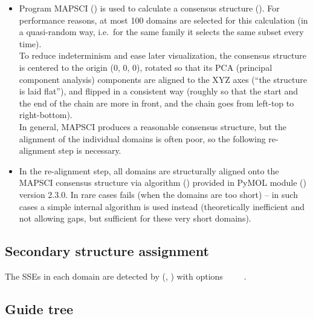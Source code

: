 \documentclass{article}
\begin{document}
\begin{itemize}
\item
  Program MAPSCI () is used to calculate a
  consensus structure ().
  For performance reasons, at most 100 domains are selected for this
  calculation (in a quasi-random way, i.e.~for the same family it selects 
  the same subset every time).\\
  To reduce indeterminism and ease later visualization, the consensus
  structure is centered to the origin (0, 0, 0), rotated so that its PCA
  (principal component analysis)
  components are aligned to the XYZ axes (``the structure is laid
  flat''), and flipped in a consistent way (roughly so that the start and 
  the end of the chain are more in front, and the chain goes from left-top 
  to right-bottom).\\
  In general, MAPSCI produces a reasonable consensus structure, but the
  alignment of the individual domains is often poor, so the
  following re-alignment step is necessary.
\item
  In the re-alignment step, all domains are structurally aligned onto the
  MAPSCI consensus structure via  algorithm 
  ()
  provided in PyMOL module () version 2.3.0. 
  In rare cases  fails (when the domains are too short) -- 
  in such cases a simple internal algorithm is used instead (theoretically 
  inefficient and not allowing gaps, but sufficient for these
  very short domains).
\end{itemize}



\subsection{Secondary structure assignment}

The SSEs in each domain are detected by  
(, ) 
with options ~ ~ ~.



\subsection{Guide tree}
\end{document}
